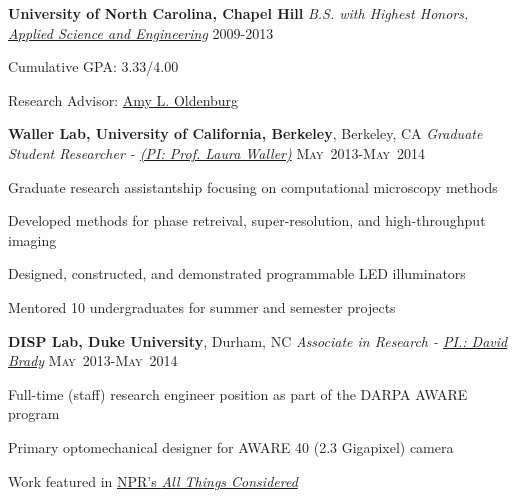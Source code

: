 \documentclass[12pt,letterpaper]{article}
\newenvironment{itemize*}%
{\begin{itemize}%
  \setlength{\itemsep}{0pt}}%
{\end{itemize}}
\newcommand{\mhead}[1]{\leavevmode\marginpar{\sffamily\footnotesize #1}}
\newcommand{\rdate}[1]{{} \hfill #1}
\begin{document}
\medskip
\textbf{University of North Carolina, Chapel Hill} \newline
\emph{B.S. with Highest Honors, \href{https://www.bme.unc.edu/}{Applied Science and Engineering}} \rdate{2009-2013}
\begin{itemize*}
  \item Cumulative GPA: 3.33/4.00
  \item Research Advisor: \href{http://user.physics.unc.edu/~aold/people.htm}{Amy L. Oldenburg}
%
\end{itemize*}

\medskip
\mhead{Research \newline Experience}%
\textbf{Waller Lab, \textbf{University of California, Berkeley}}, Berkeley, CA \newline
\emph{Graduate Student Researcher - \href{http://www.laurawaller.com}{(PI: Prof. Laura Waller)}} \rdate{\textsc{May}~2013-\textsc{May}~2014}
\begin{itemize*}
  \item Graduate research assistantship focusing on computational microscopy methods
  \item Developed methods for phase retreival, super-resolution, and high-throughput imaging
  \item Designed, constructed, and demonstrated  programmable LED illuminators
  \item Mentored 10 undergraduates for summer and semester projects
\end{itemize*}

\medskip
\textbf{DISP Lab, \textbf{Duke University}}, Durham, NC \newline
\emph{Associate in Research - \href{http://www.disp.duke.edu/}{PI.: David Brady} } \rdate{\textsc{May}~2013-\textsc{May}~2014}
\begin{itemize*}
 	\item Full-time (staff) research engineer position as part of the DARPA AWARE program
	\item Primary optomechanical designer for AWARE 40 (2.3 Gigapixel) camera
	\item Work featured in \href{http://www.npr.org/2013/12/10/250000359/supercamera-more-pixels-than-you-know-what-to-do-with}{NPR's \textit{All Things Considered}}
\end{itemize*}
\end{document}
